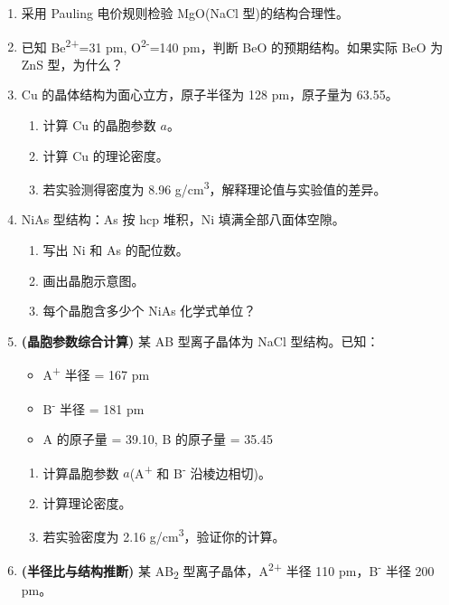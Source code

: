 \begin{enumerate}
\def\labelenumi{\arabic{enumi}.}
\setcounter{enumi}{14}
\item
  采用 Pauling 电价规则检验 MgO(NaCl 型)的结构合理性。
\item
  已知 Be\textsuperscript{2+}=31 pm, O\textsuperscript{2-}=140 pm，判断 BeO 的预期结构。如果实际 BeO 为 ZnS 型，为什么？
\item
  Cu 的晶体结构为面心立方，原子半径为 128 pm，原子量为 63.55。

  \begin{enumerate}
  \def\labelenumii{(\alph{enumii})}
  \tightlist
  \item
    计算 Cu 的晶胞参数 \(a\)。
  \item
    计算 Cu 的理论密度。
  \item
    若实验测得密度为 8.96 g/cm\textsuperscript{3}，解释理论值与实验值的差异。
  \end{enumerate}
\item
  NiAs 型结构：As 按 hcp 堆积，Ni 填满全部八面体空隙。

  \begin{enumerate}
  \def\labelenumii{(\alph{enumii})}
  \tightlist
  \item
    写出 Ni 和 As 的配位数。
  \item
    画出晶胞示意图。
  \item
    每个晶胞含多少个 NiAs 化学式单位？
  \end{enumerate}
\item
  \textbf{(晶胞参数综合计算)} 某 AB 型离子晶体为 NaCl 型结构。已知：

  \begin{itemize}
  \tightlist
  \item
    A\textsuperscript{+} 半径 = 167 pm
  \item
    B\textsuperscript{-} 半径 = 181 pm
  \item
    A 的原子量 = 39.10, B 的原子量 = 35.45
  \end{itemize}

  \begin{enumerate}
  \def\labelenumii{(\alph{enumii})}
  \tightlist
  \item
    计算晶胞参数 \(a\)(A\textsuperscript{+} 和 B\textsuperscript{-} 沿棱边相切)。
  \item
    计算理论密度。
  \item
    若实验密度为 2.16 g/cm\textsuperscript{3}，验证你的计算。
  \end{enumerate}
\item
  \textbf{(半径比与结构推断)} 某 AB\textsubscript{2} 型离子晶体，A\textsuperscript{2+} 半径 110 pm，B\textsuperscript{-} 半径 200 pm。


\end{enumerate}
